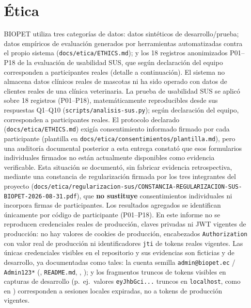 \section{\'Etica}

BIOPET utiliza tres categor\'ias de datos: datos sint\'eticos de
desarrollo/prueba; datos emp\'iricos de evaluaci\'on generados por
herramientas automatizadas contra el propio sistema
(\texttt{docs/etica/ETHICS.md}); y los 18 registros anonimizados
P01--P18 de la evaluaci\'on de usabilidad SUS, que seg\'un declaraci\'on
del equipo corresponden a participantes reales (detalle a continuaci\'on).
El sistema no
almacena datos cl\'inicos reales de mascotas ni ha sido operado con datos
de clientes reales de una cl\'inica veterinaria. La prueba de usabilidad
SUS se aplic\'o sobre 18 registros (P01--P18), matem\'aticamente
reproducibles desde sus respuestas Q1--Q10
(\texttt{scripts/analisis-sus.py}); seg\'un declaraci\'on del equipo,
corresponden a participantes reales. El protocolo declarado
(\texttt{docs/etica/ETHICS.md}) exig\'ia consentimiento informado firmado
por cada participante (plantilla en
\texttt{docs/etica/consentimientos/plantilla.md}), pero una auditor\'ia
documental posterior a esta entrega constat\'o que esos formularios
individuales firmados no est\'an actualmente disponibles como evidencia
verificable. Esta situaci\'on se document\'o, sin fabricar evidencia
retrospectiva, mediante una constancia de regularizaci\'on firmada por
los tres integrantes del proyecto
(\texttt{docs/etica/regularizacion-sus/CONSTANCIA-REGULARIZACION-SUS-BIOPET-2026-08-31.pdf}),
que \textbf{no sustituye} consentimientos individuales ni incorpora
firmas de participantes. Los resultados agregados se identifican
\'unicamente por c\'odigo de participante (P01--P18). En este informe no
se reproducen credenciales reales de producci\'on, claves privadas ni
JWT vigentes de producci\'on: no hay valores de cookies de
producci\'on, encabezados \texttt{Authorization} con valor real de
producci\'on ni identificadores \texttt{jti} de tokens reales vigentes.
Las \'unicas credenciales visibles en el repositorio y sus evidencias
son ficticias y de desarrollo, ya documentadas como tales: la cuenta
semilla \texttt{admin@biopet.ec} / \texttt{Admin123*}
(, \texttt{README.md},
,
); y los fragmentos
truncos de tokens visibles en capturas de desarrollo
(p.~ej.\ valores \texttt{eyJhbGci...} truncos en \texttt{localhost},
como en )
corresponden a sesiones locales expiradas, no a tokens de producci\'on
vigentes.


